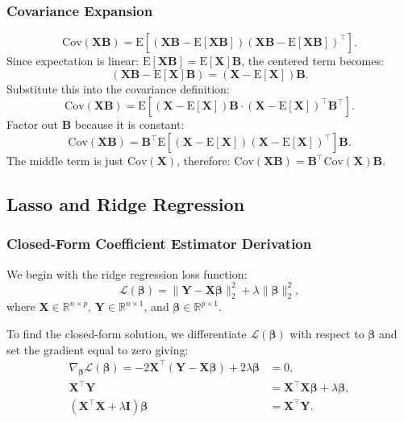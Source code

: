 \documentclass[11pt]{report} %
\begin{document}
\subsubsection{Covariance Expansion}
\label{Covariance Expansion}
\[
\text{Cov}(\mathbf{X} \mathbf{B}) = \text{E}[(\mathbf{X} \mathbf{B} - \text{E}[\mathbf{X} \mathbf{B}]) (\mathbf{X} \mathbf{B} - \text{E}[\mathbf{X} \mathbf{B}])^\top].
\]
Since expectation is linear: $\text{E}[\mathbf{X} \mathbf{B}] = \text{E}[\mathbf{X}] \mathbf{B}$, the centered term becomes: 
\[
(\mathbf{X} \mathbf{B} - \text{E}[\mathbf{X}] \mathbf{B}) = (\mathbf{X} - \text{E}[\mathbf{X}]) \mathbf{B}.
\]
Substitute this into the covariance definition:
\[
\text{Cov}(\mathbf{X} \mathbf{B}) = \text{E} \left[ (\mathbf{X} - \text{E}[\mathbf{X}]) \mathbf{B} \cdot (\mathbf{X} - \text{E}[\mathbf{X}])^\top \mathbf{B}^\top \right].
\]
Factor out \( \mathbf{B} \) because it is constant:
\[
\text{Cov}(\mathbf{X} \mathbf{B})=\mathbf{B}^\top \text{E} \left[ (\mathbf{X} - \text{E}[\mathbf{X}]) (\mathbf{X} - \text{E}[\mathbf{X}])^\top \right] \mathbf{B}.
\]
The middle term is just \( \text{Cov}(\mathbf{X}) \), therefore:
$
\text{Cov}(\mathbf{X} \mathbf{B}) = \mathbf{B}^\top \text{Cov}(\mathbf{X}) \mathbf{B}.
$

\subsection{Lasso and Ridge Regression}
\subsubsection{Closed-Form Coefficient Estimator Derivation}
\label{ridge-appendix}
We begin with the ridge regression loss function:
\begin{equation*}
\mathcal{L}(\boldsymbol{\beta}) = \| \mathbf{Y} - \mathbf{X} \boldsymbol{\beta} \|_2^2 + \lambda \| \boldsymbol{\beta} \|_2^2,
\end{equation*}
where \(\mathbf{X} \in \mathbb{R}^{n \times p}\), \(\mathbf{Y} \in \mathbb{R}^{n \times 1}\), and \(\boldsymbol{\beta} \in \mathbb{R}^{p \times 1}\).

To find the closed-form solution, we differentiate \(\mathcal{L}(\boldsymbol{\beta})\) with respect to \(\boldsymbol{\beta}\) and set the gradient equal to zero giving:
\begin{align*}
\nabla_{\boldsymbol{\beta}} \mathcal{L}(\boldsymbol{\beta}) 
    = -2 \mathbf{X}^\top (\mathbf{Y} - \mathbf{X} \boldsymbol{\beta}) + 2 \lambda \boldsymbol{\beta} &= 0, \\
\mathbf{X}^\top \mathbf{Y} 
    &= \mathbf{X}^\top \mathbf{X} \boldsymbol{\beta} + \lambda \boldsymbol{\beta}, \\
(\mathbf{X}^\top \mathbf{X} + \lambda \mathbf{I}) \boldsymbol{\beta} 
    &= \mathbf{X}^\top \mathbf{Y}.
\end{align*}
\end{document}
